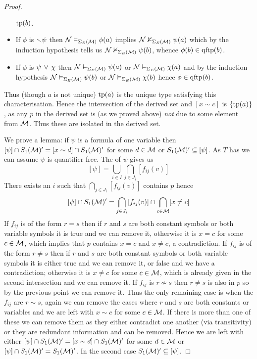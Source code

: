 \begin{proof}
\begin{itemize}
            $\operatorname{tp}(b)$.
        \item If $\phi$ is $\smallsetminus \psi$ then $\mathcal{N} \vDash_{\Sigma_E(\mathcal{M})} \phi(a)$
            implies $\mathcal{N} \nvDash_{\Sigma_E(\mathcal{M})} \psi(a)$ which by the induction 
            hypothesis tells us $\mathcal{N} \nvDash_{\Sigma_E(\mathcal{M})} \psi(b)$, 
            whence $\phi(b) \in \operatorname{qftp}(b)$.
        \item If $\phi$ is $\psi \, \lor \, \chi$ then 
            $\mathcal{N} \vDash_{\Sigma_E(\mathcal{M})} \psi(a)$ or 
                $\mathcal{N} \vDash_{\Sigma_E(\mathcal{M})} \chi(a)$
            and by the induction hypothesis 
            $\mathcal{N} \vDash_{\Sigma_E(\mathcal{M})} \psi(b)$ or 
            $\mathcal{N} \vDash_{\Sigma_E(\mathcal{M})} \chi(b)$
            hence $\phi \in \operatorname{qftp}(b)$.
    \end{itemize}
    Thus (though $a$ is not unique) $\operatorname{tp}(a)$ is the unique type satisfying 
    this characterisation.
    Hence the intersection of the derived set and 
    $[x \sim c]$ is $\left\{\operatorname{tp}(a)\right\}$,
    as any $p$ in the derived set is (as we proved above) \emph{not} due 
    to some element from $\mathcal{M}$.
    Thus these are isolated in the derived set.

    We prove a lemma:
    if $\psi$ is a formula of one variable
    then $[\psi] \cap S_1(\mathcal{M})' = [x \sim d] \cap S_1(\mathcal{M})'$ for some 
    $d \in \mathcal{M}$ or 
    $S_1(\mathcal{M})' \subseteq [\psi]$.
    As $T$ has  
    we can assume $\psi$ is quantifier free.
    The  of $\psi$
    gives us 
    \[[\psi] = \bigcup_{i \in I} \bigcap_{j \in J_{i}} [f_{ij}(v)]\]
    There exists an $i$ such that $\bigcap_{j \in J_{i}} [f_{ij}(v)]$ 
    contains $p$ hence 
    \[  
        [\psi] \cap S_1(\mathcal{M})' =  \bigcap_{j \in J_{i}} [f_{ij}(v)] 
            \cap \bigcap_{c \in \mathcal{M}} [x \ne c]
    \]
    If $f_{ij}$ is of the form $r = s$ then if $r$ and $s$ are both constant
    symbols or both variable symbols it is true and we can remove it,
    otherwise it is $x = c$ for some $c \in \mathcal{M}$, which implies that $p$
    contains $x = c$ and $x \ne c$, a contradiction.
    If $f_{ij}$ is of the form $r \ne s$ then if $r$ and $s$ are both constant
    symbols or both variable symbols it is either true and we can remove it,
    or false and we have a contradiction;
    otherwise it is $x \ne c$ for some $c \in \mathcal{M}$, 
    which is already given in the second intersection and we can remove it.
    If $f_{ij}$ is $r \nsim s$ then $r \ne s$ is also in $p$ so by the previous
    point we can remove it.
    Thus the only remaining case is when the $f_{ij}$ are $r \sim s$,
    again we can remove the cases where $r$ and $s$ are both constants or 
    variables and we are left with $x \sim c$ for some $c \in \mathcal{M}$.
    If there is more than one of these we can remove them as they either 
    contradict one another (via transitivity) or they are redundant information
    and can be removed.
    Hence we are left with either $[\psi] \cap S_1(\mathcal{M})' = [x \sim d] 
    \cap S_1(\mathcal{M})'$ for some $d \in \mathcal{M}$ or 
    $[\psi] \cap S_1(\mathcal{M})' = S_1(\mathcal{M})'$.
    In the second case $S_1(\mathcal{M})' \subseteq [\psi]$.


\end{proof}
